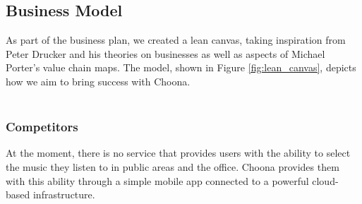 \subsection{Business Model}
As part of the business plan, we created a lean canvas, taking inspiration from Peter Drucker and his theories on businesses as well as aspects of Michael Porter's value chain maps.  The model, shown in Figure \ref{fig:lean_canvas}, depicts how we aim to bring success with Choona.\\

\noindent{}\\

\subsubsection{Competitors}
At the moment, there is no service that provides users with the ability to select the music they listen to in public areas and the office.  Choona provides them with this ability through a simple mobile app connected to a powerful cloud-based infrastructure.   \\

